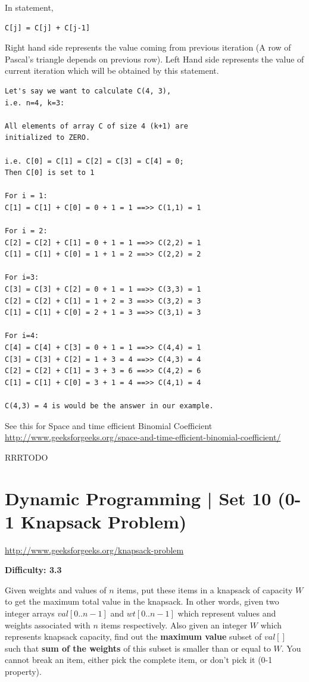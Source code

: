 In statement,
\begin{lstlisting}[style=raycppnewsnippet]
C[j] = C[j] + C[j-1]
\end{lstlisting}
Right hand side represents the value coming from previous iteration (A row
of Pascal's triangle depends on previous row). Left Hand side represents the
value of current iteration which will be obtained by this statement.
\begin{lstlisting}[style=raygeneric]
Let's say we want to calculate C(4, 3), 
i.e. n=4, k=3:

All elements of array C of size 4 (k+1) are
initialized to ZERO.

i.e. C[0] = C[1] = C[2] = C[3] = C[4] = 0;
Then C[0] is set to 1

For i = 1:
C[1] = C[1] + C[0] = 0 + 1 = 1 ==>> C(1,1) = 1

For i = 2:
C[2] = C[2] + C[1] = 0 + 1 = 1 ==>> C(2,2) = 1
C[1] = C[1] + C[0] = 1 + 1 = 2 ==>> C(2,2) = 2

For i=3:
C[3] = C[3] + C[2] = 0 + 1 = 1 ==>> C(3,3) = 1
C[2] = C[2] + C[1] = 1 + 2 = 3 ==>> C(3,2) = 3
C[1] = C[1] + C[0] = 2 + 1 = 3 ==>> C(3,1) = 3

For i=4:
C[4] = C[4] + C[3] = 0 + 1 = 1 ==>> C(4,4) = 1
C[3] = C[3] + C[2] = 1 + 3 = 4 ==>> C(4,3) = 4
C[2] = C[2] + C[1] = 3 + 3 = 6 ==>> C(4,2) = 6
C[1] = C[1] + C[0] = 3 + 1 = 4 ==>> C(4,1) = 4

C(4,3) = 4 is would be the answer in our example.
\end{lstlisting}
See this for Space and time efficient Binomial Coefficient
\url{http://www.geeksforgeeks.org/space-and-time-efficient-binomial-coefficient/}

RRRTODO


\section{Dynamic Programming | Set 10 (0-1 Knapsack Problem)
  \label{secGFGDPSet10Knapsack01Prob}}

\url{http://www.geeksforgeeks.org/knapsack-problem}

\textbf{Difficulty: 3.3}

Given weights and values of $n$ items, put these items in a knapsack of
capacity $W$ to get the maximum total value in the knapsack. In other words,
given two integer arrays $val[0..n-1]$ and $wt[0..n-1]$ which represent
values and weights associated with $n$ items respectively. Also given an
integer $W$ which represents knapsack capacity, find out the \textbf{maximum
  value} subset of $val[]$ such that \textbf{sum of the weights} of this
subset is smaller than or equal to $W$. You cannot break an item, either
pick the complete item, or don't pick it (0-1 property).

